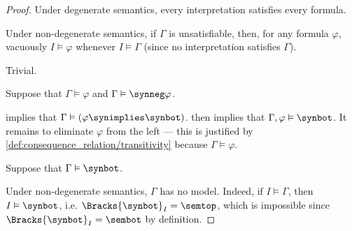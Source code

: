 \begin{proof}
   Under degenerate semantics, every interpretation satisfies every formula.

  Under non-degenerate semantics, if \( \Gamma \) is unsatisfiable, then, for any formula \( \varphi \), vacuously \( I \vDash \varphi \) whenever \( I \vDash \Gamma \) (since no interpretation satisfies \( \Gamma \)).

   Trivial.

   Suppose that \( \Gamma \vDash \varphi \) and \( \Gamma \vDash \synneg \varphi \).

   implies that \( \Gamma \vDash (\varphi \synimplies \synbot) \).  then implies that \( \Gamma, \varphi \vDash \synbot \). It remains to eliminate \( \varphi \) from the left --- this is justified by \cref{def:consequence_relation/transitivity} because \( \Gamma \vDash \varphi \).

   Suppose that \( \Gamma \vDash \synbot \).

  Under non-degenerate semantics, \( \Gamma \) has no model. Indeed, if \( I \vDash \Gamma \), then \( I \vDash \synbot \), i.e. \( \Bracks{\synbot}_I = \semtop \), which is impossible since \( \Bracks{\synbot}_I = \sembot \) by definition.
\end{proof}

